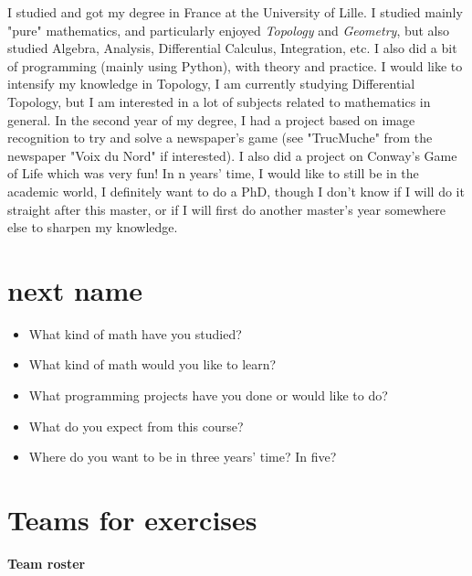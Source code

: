 \documentclass[11pt]{amsart}
\begin{document}
I studied and got my degree in France at the University of Lille. I studied mainly "pure" mathematics, and particularly enjoyed \textit{Topology} and \textit{Geometry}, but also studied Algebra, Analysis, Differential Calculus, Integration, etc. I also did a bit of programming (mainly using Python), with theory and practice.
I would like to intensify my knowledge in Topology, I am currently studying Differential Topology, but I am interested in a lot of subjects related to mathematics in general.
In the second year of my degree, I had a project based on image recognition to try and solve a newspaper's game (see "TrucMuche" from the newspaper "Voix du Nord" if interested). I also did a project on Conway's Game of Life which was very fun!
In n years' time, I would like to still be in the academic world, I definitely want to do a PhD, though I don't know if I will do it straight after this master, or if I will first do another master's year somewhere else to sharpen my knowledge.

\medskip 

\section*{next name}


\begin{itemize}
\item What kind of math have you studied?
\item What kind of math would you like to learn?
\item What programming projects have you done or would like to do?
\item What do you expect from this course?
\item Where do you want to be in three years' time? In five?
\end{itemize}


\medskip

\newpage
\section*{Teams for exercises}

\begin{center}
  \textbf{\sffamily Team roster}
\end{center}
\end{document}
